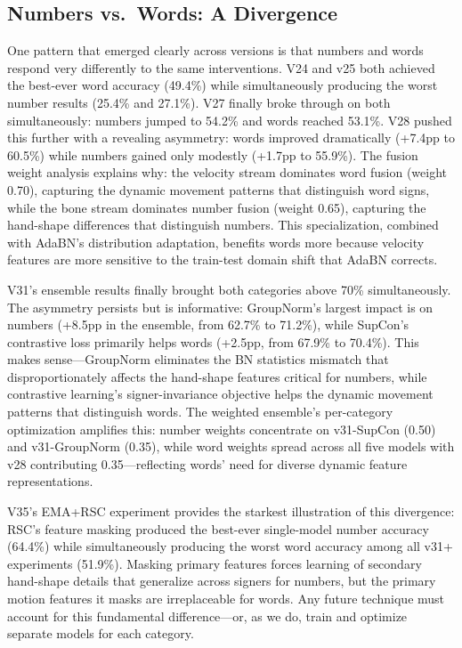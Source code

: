 \documentclass[conference]{IEEEtran}
\begin{document}
\subsection{Numbers vs.\ Words: A Divergence}

One pattern that emerged clearly across versions is that numbers and words respond very differently to the same interventions. V24 and v25 both achieved the best-ever word accuracy (49.4\%) while simultaneously producing the worst number results (25.4\% and 27.1\%). V27 finally broke through on both simultaneously: numbers jumped to 54.2\% and words reached 53.1\%. V28 pushed this further with a revealing asymmetry: words improved dramatically (+7.4pp to 60.5\%) while numbers gained only modestly (+1.7pp to 55.9\%). The fusion weight analysis explains why: the velocity stream dominates word fusion (weight 0.70), capturing the dynamic movement patterns that distinguish word signs, while the bone stream dominates number fusion (weight 0.65), capturing the hand-shape differences that distinguish numbers. This specialization, combined with AdaBN's distribution adaptation, benefits words more because velocity features are more sensitive to the train-test domain shift that AdaBN corrects.

V31's ensemble results finally brought both categories above 70\% simultaneously. The asymmetry persists but is informative: GroupNorm's largest impact is on numbers (+8.5pp in the ensemble, from 62.7\% to 71.2\%), while SupCon's contrastive loss primarily helps words (+2.5pp, from 67.9\% to 70.4\%). This makes sense---GroupNorm eliminates the BN statistics mismatch that disproportionately affects the hand-shape features critical for numbers, while contrastive learning's signer-invariance objective helps the dynamic movement patterns that distinguish words. The weighted ensemble's per-category optimization amplifies this: number weights concentrate on v31-SupCon (0.50) and v31-GroupNorm (0.35), while word weights spread across all five models with v28 contributing 0.35---reflecting words' need for diverse dynamic feature representations.

V35's EMA+RSC experiment provides the starkest illustration of this divergence: RSC's feature masking produced the best-ever single-model number accuracy (64.4\%) while simultaneously producing the worst word accuracy among all v31+ experiments (51.9\%). Masking primary features forces learning of secondary hand-shape details that generalize across signers for numbers, but the primary motion features it masks are irreplaceable for words. Any future technique must account for this fundamental difference---or, as we do, train and optimize separate models for each category.
\end{document}
